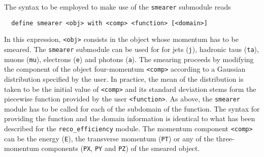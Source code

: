 \documentclass[a4paper]{article}
\begin{document}
\noindent The syntax to be employed to make use of the \verb+smearer+ submodule
reads
{\color{ao} \begin{verbatim}
  define smearer <obj> with <comp> <function> [<domain>]
\end{verbatim}}
\noindent In this expression, \verb+<obj>+ consists in the object whose momentum
has to be smeared. The {\tt smearer} submodule can be used for for jets
(\verb+j+), hadronic taus (\verb+ta+), muons (\verb+mu+), electrons (\verb+e+)
and photons (\verb+a+). The smearing proceeds by modifying the component of the
object four-momentum {\tt <comp>} according to a Gaussian distribution specified
by the user. In practice, the mean of the distribution is taken to be the
initial value of {\tt <comp>} and its standard deviation stems form the
piecewise function provided by the user {\tt <function>}. As above,
the {\tt smearer} module has to be called for each of the subdomain of the
function. The syntax for providing the function and the domain information is
identical to what has been described for the {\tt reco\_efficiency} module. The
momentum component {\tt <comp>} can be the energy (\verb|E|), the transverse
momentum (\verb|PT|) or any of the three-momentum components (\verb+PX+,
\verb+PY+ and \verb+PZ+) of the smeared object.
\end{document}
